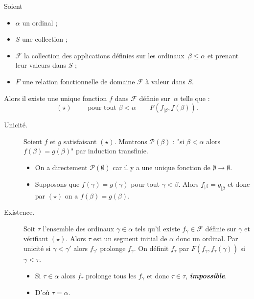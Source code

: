 \documentclass[./main]{subfiles}
\begin{document}
  \begin{lem}
    Soient
    \begin{itemize}
      \item $\alpha$ un ordinal ;
      \item $S$ une collection ;
      \item $\mathcal{F}$ la collection des applications définies sur les ordinaux~$\beta \le \alpha$ et prenant leur valeurs dans $S$ ;
      \item $F$ une relation fonctionnelle de domaine $\mathcal{F}$ à valeur dans $S$.
    \end{itemize}
    Alors il existe une unique fonction $f$ dans $\mathcal{F}$ définie sur~$\alpha$ telle que :
    \[
      (\star) \quad\quad \text{ pour tout } \beta < \alpha \quad\quad F(f_{|\beta}, f(\beta))
    .\] 
  \end{lem}

  \begin{prv}
    \begin{description}
      \item[Unicité.]
        Soient $f$ et $g$ satisfaisant $(\star)$.
        Montrons $\mathcal{P}(\beta)$ : "si $\beta < \alpha$ alors $f(\beta) = g(\beta)$" par induction transfinie.
        \begin{itemize}
          \item On a directement $\mathcal{P}(\emptyset)$ car il y a une unique fonction de $\emptyset \to \emptyset$.
          \item Supposons que $f(\gamma) = g(\gamma)$ pour tout $\gamma < \beta$.
            Alors $f_{|\beta} = g_{|\beta}$ et donc par $(\star)$ on a  $f(\beta) = g(\beta)$.
        \end{itemize}
      \item[Existence.]
        Soit $\tau$ l'ensemble des ordinaux $\gamma \in \alpha$ tels qu'il existe $f_\gamma \in \mathcal{F}$ définie sur $\gamma$ et vérifiant $(\star)$.
        Alors $\tau$ est un segment initial de $\alpha$ donc un ordinal.
        Par unicité si $\gamma < \gamma'$ alors $f_{\gamma'}$ prolonge $f_\gamma$.
        On définit  $f_\tau$ par  $F(f_\gamma, f_\tau(\gamma))$ si  $\gamma < \tau$.
         \begin{itemize}
          \item Si $\tau \in \alpha$ alors $f_\tau$ prolonge tous les $f_\gamma$ et donc $\tau \in \tau$, \textit{\textbf{impossible}}.
          \item D'où $\tau = \alpha$.
        \end{itemize}
    \end{description}
  \end{prv}
\end{document}
